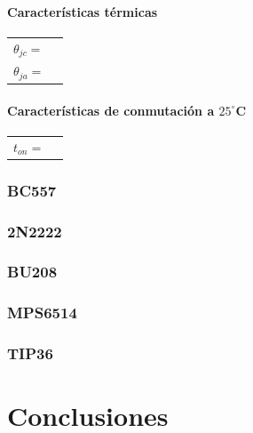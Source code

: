 \documentclass[chaptersright]{informeutn}
\begin{document}
    \subsubsection{Características térmicas}
    \begin{tabular}{ll}
    $\theta_{jc} = $ \\
    $\theta_{ja} = $ \\
    \end{tabular}
    
    \subsubsection{Características de conmutación a $25^\circ$C}
    \begin{tabular}{ll}
    $t_{on} = $ \\
    \end{tabular}


  \subsection{BC557}

  \subsection{2N2222}

  \subsection{BU208}

  \subsection{MPS6514}

  \subsection{TIP36}

\chapter{Conclusiones}
\end{document}

